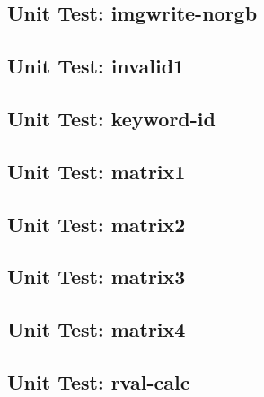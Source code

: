 \subsection*{Unit Test: imgwrite-norgb}

 \clearpage
\subsection*{Unit Test: invalid1}

 \clearpage
\subsection*{Unit Test: keyword-id}

 \clearpage
\subsection*{Unit Test: matrix1}

 \clearpage
\subsection*{Unit Test: matrix2}

 \clearpage
\subsection*{Unit Test: matrix3}

 \clearpage
\subsection*{Unit Test: matrix4}

 \clearpage
\subsection*{Unit Test: rval-calc}

 \clearpage
